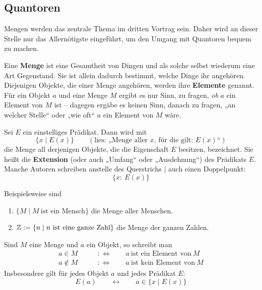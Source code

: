 \subsection*{Quantoren}


Mengen werden das zentrale Thema im dritten Vortrag sein. Daher wird an dieser Stelle nur das Allernötigste eingeführt, um den Umgang mit Quantoren bequem zu machen.


\begin{de} \label{mengenimlogikkapitel}
    Eine \textbf{Menge} ist eine Gesamtheit von Dingen und als solche selbst wiederum eine Art Gegenstand. Sie ist allein dadurch bestimmt, welche Dinge ihr angehören. Diejenigen Objekte, die einer Menge angehören, werden ihre \textbf{Elemente} genannt. Für ein Objekt $a$ und eine Menge $M$ ergibt es nur Sinn, zu fragen, \emph{ob} $a$ ein Element von $M$ ist -- dagegen ergäbe es keinen Sinn, danach zu fragen, „an welcher Stelle“ oder „wie oft“ $a$ ein Element von $M$ wäre.
\end{de}


\begin{de} \label{extensionimlogikkapitel}
    Sei $E$ ein einstelliges Prädikat. Dann wird mit
        \[ \{ x\mid E(x) \} \qquad (\text{lies: „Menge aller $x$, für die gilt: $E(x)$“})\]
    die Menge all derjenigen Objekte, die die Eigenschaft $E$ besitzen, bezeichnet. Sie heißt die \textbf{Extension} (oder auch „Umfang“ oder „Ausdehnung“) des Prädikats $E$. Manche Autoren schreiben anstelle des Querstrichs $\vert$ auch einen Doppelpunkt:
        \[ \{x:\ E(x) \}\]
\end{de}


\begin{bsp}
    Beispielsweise sind
    \begin{enumerate}
        \item $\{M\mid M\ \text{ist ein Mensch}\}$ die Menge aller Menschen.
        \item $\mathbb Z:= \{n\mid n\ \text{ist eine ganze Zahl}\}$ die Menge der ganzen Zahlen.
    \end{enumerate}
\end{bsp}


\begin{nota}[Elementzeichen]
    Sind $M$ eine Menge und $a$ ein Objekt, so schreibt man
    \begin{align*}
        a\in M\qquad&:\Leftrightarrow\qquad a\ \text{ist ein Element von}\ M \\
        a\notin M\qquad&:\Leftrightarrow\qquad a\ \text{ist kein Element von}\ M
    \end{align*}
    Insbesondere gilt für jedes Objekt $a$ und jedes Prädikat $E$:
        \[ E(a) \qquad\leftrightarrow\qquad a\in \{x\mid E(x)\} \]
\end{nota}


